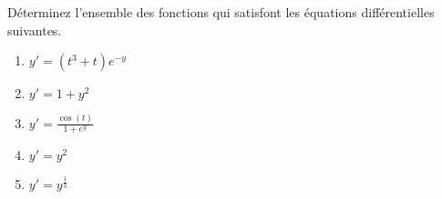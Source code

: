 
\begin{exercice}\label{exoTD6b-0002}

Déterminez l'ensemble des fonctions qui satisfont les équations différentielles suivantes.

\begin{enumerate}
	\item $ y' = (t^3 + t) e^{-y} $
	\item $ y' = 1 + y^2 $
	\item $ y' = \frac{\cos(t)}{1 + e^y} $
	\item $ y' = y^2 $
	\item $ y' = y^{\frac{1}{3}} $
	
\end{enumerate}	


\end{exercice}
